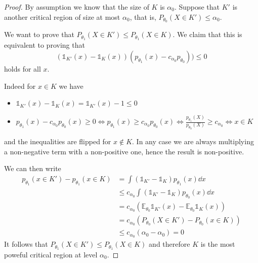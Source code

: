 \documentclass[12pt]{extarticle}
\newcommand{\E}{\mathds{E}}
\begin{document}
\begin{proof}
	By assumption we know that the size of $K$ is $\alpha_0$.
	Suppose that $K'$ is another critical region of size at most $\alpha_0$,
	that is, $P_{\theta_0}(X \in K') \leq \alpha_0$.

	We want to prove that
	$P_{\theta_1}(X \in K') \leq P_{\theta_1}(X \in K)$.
	We claim that this is equivalent to proving that
	\begin{equation}
		(\mathds{1}_{K'}(x) - \mathds{1}_{K}(x))(p_{\theta_1}(x) - c_{\alpha_0}p_{\theta_0})) \leq 0
	\end{equation}
	holds for all $x$.

	Indeed for $x \in K$ we have
	\begin{itemize}
		\item $\mathds 1_{K'}(x) - \mathds 1_{K}(x) = \mathds 1_{K'}(x) -1 \leq 0$
		\item $p_{\theta_1}(x) - c_{\alpha_0}p_{\theta_0}(x) \geq 0 \iff p_{\theta_1}(x) \geq c_{\alpha_0}p_{\theta_0}(x) \iff \frac{p_{\theta_1}(X)}{p_{\theta_0}(X)} \geq c_{\alpha_0} \iff x \in K$
	\end{itemize}
	and the inequalities are flipped for $x \notin K$.
	In any case we are always multiplying a non-negative term with a non-positive one,
	hence the result is non-positive.

	We can then write
	\begin{align}
		p_{\theta_1}(x \in K') - p_{\theta_1}(x \in K) & = \int (\mathds 1_{K'} - \mathds 1_{K}) p_{\theta_1}(x) \dd x                   \\
		                                               & \leq c_{\alpha_0} \int (\mathds 1_{K'} - \mathds 1_{K}) p_{\theta_0}(x) \dd x   \\
		                                               & = c_{\alpha_0} (\E_{\theta_0} \mathds 1_{K'}(x) - \E_{\theta_0} \mathds 1_K(x)) \\
		                                               & = c_{\alpha_0} (P_{\theta_0}(X \in K') - P_{\theta_0}(x \in K))                 \\
		                                               & \leq c_{\alpha_0} (\alpha_0 - \alpha_0) = 0
	\end{align}
	It follows that $P_{\theta_1}(X \in K') \leq P_{\theta_1}(X \in K)$
	and therefore $K$ is the most poweful critical region at level $\alpha_0$.
\end{proof}
\end{document}

